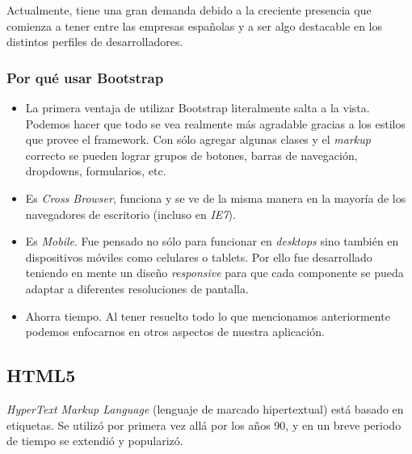 Actualmente, tiene una gran demanda debido a la creciente presencia que comienza a tener entre las empresas espa\~nolas y a ser algo destacable en los distintos perfiles de desarrolladores.\\

\subsubsection{Por qu\'e usar Bootstrap}

\begin{itemize}

\item La primera ventaja de utilizar Bootstrap literalmente salta a la vista. Podemos hacer que todo se vea realmente m\'as agradable gracias a los estilos que provee el framework. Con s\'olo agregar algunas clases y el \textit{markup} correcto se pueden lograr grupos de botones, barras de navegaci\'on, dropdowns, formularios, etc. 
\item Es \textit{Cross Browser}, funciona y se ve de la misma manera en la mayor\'ia de los navegadores de escritorio (incluso en \textit{IE7}).
\item Es \textit{Mobile}. Fue pensado no s\'olo para funcionar en \textit{desktops} sino tambi\'en en dispositivos m\'oviles como celulares o tablets. Por ello fue desarrollado teniendo en mente un dise\~no \textit{responsive} para que cada componente se pueda adaptar a diferentes resoluciones de pantalla. 
\item Ahorra tiempo. Al tener resuelto todo lo que mencionamos anteriormente podemos enfocarnos en otros aspectos de nuestra aplicaci\'on.

\end{itemize}

\subsection{HTML5}

\textit{HyperText Markup Language} (lenguaje de marcado hipertextual) est\'a basado en etiquetas. Se utiliz\'o por primera vez all\'a por los a\~nos 90, y en un breve periodo de tiempo se extendi\'o y populariz\'o.\\

